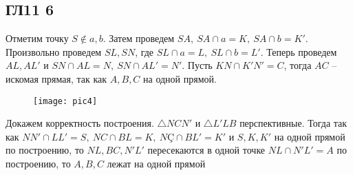 \subsection*{ГЛ11 6}
Отметим точку $S \notin a,b$. Затем проведем $SA,\ SA \cap a = K,\ SA \cap b = K'$. Произвольно проведем $SL, SN$, где $SL \cap a = L,\ SL \cap b = L'$. Теперь проведем $AL,AL'$ и $SN \cap AL = N,\ SN \cap AL' = N'$. Пусть $KN \cap K'N' = C$, тогда $AC$ -- искомая прямая, так как $A,B,C$ на одной прямой.\\
\begin{figure}[h]
	\texttt{[image: pic4]}
\end{figure}
Докажем корректность построения. $\triangle NCN'$ и $\triangle L'LB$ перспективные. Тогда так как $NN' \cap LL'= S,\ NC \cap BL = K,\ NÇ \cap BL'= K'$ и $S,K,K'$ на одной прямой по построению, то $NL, BC, N'L'$ пересекаются в одной точке $NL \cap N'L' = A$ по построению, то $A,B,C$ лежат на одной прямой
		
		